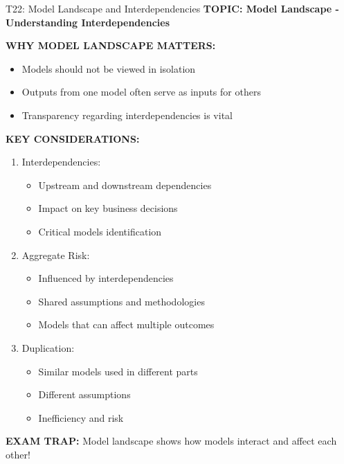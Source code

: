 \documentclass[8pt]{beamer}
\begin{document}
	\begin{frame}{T22: Model Landscape and Interdependencies}
		\fontsize{6.5}{7.5}\selectfont
		\textbf{TOPIC: Model Landscape - Understanding Interdependencies}
		
		\vspace{0.1cm}
		\textbf{WHY MODEL LANDSCAPE MATTERS:}
		\begin{itemize}
			\item Models should not be viewed in isolation
			\item Outputs from one model often serve as inputs for others
			\item Transparency regarding interdependencies is vital
		\end{itemize}
		
		\vspace{0.1cm}
		\textbf{KEY CONSIDERATIONS:}
		\begin{enumerate}
			\item \textcolor{myblue}{Interdependencies:}
			\begin{itemize}
				\item Upstream and downstream dependencies
				\item Impact on key business decisions
				\item Critical models identification
			\end{itemize}
			\item \textcolor{myblue}{Aggregate Risk:}
			\begin{itemize}
				\item Influenced by interdependencies
				\item Shared assumptions and methodologies
				\item Models that can affect multiple outcomes
			\end{itemize}
			\item \textcolor{myblue}{Duplication:}
			\begin{itemize}
				\item Similar models used in different parts
				\item Different assumptions
				\item Inefficiency and risk
			\end{itemize}
		\end{enumerate}
		
		\textcolor{myred}{\textbf{EXAM TRAP:}} Model landscape shows \textcolor{myblue}{how models interact and affect each other}!
	\end{frame}
	
\end{document}
